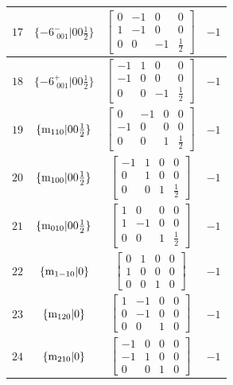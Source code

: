 \documentclass[fleqn,8pt]{jsarticle}
\begin{document}
\begin{longtable}{cccc}
$ 17 $ & $ \{-6^{-}_{\,\,001}|0 0 \frac{1}{2}\} $ & $ \begin{bmatrix} 0 & -1 & 0 & 0 \\ 1 & -1 & 0 & 0 \\ 0 & 0 & -1 & \frac{1}{2} \end{bmatrix} $ & $ -1 $ \\ \hline
$ 18 $ & $ \{-6^{+}_{\,\,001}|0 0 \frac{1}{2}\} $ & $ \begin{bmatrix} -1 & 1 & 0 & 0 \\ -1 & 0 & 0 & 0 \\ 0 & 0 & -1 & \frac{1}{2} \end{bmatrix} $ & $ -1 $ \\ \hline
$ 19 $ & $ \{{\rm m}_{110}|0 0 \frac{1}{2}\} $ & $ \begin{bmatrix} 0 & -1 & 0 & 0 \\ -1 & 0 & 0 & 0 \\ 0 & 0 & 1 & \frac{1}{2} \end{bmatrix} $ & $ -1 $ \\ \hline
$ 20 $ & $ \{{\rm m}_{100}|0 0 \frac{1}{2}\} $ & $ \begin{bmatrix} -1 & 1 & 0 & 0 \\ 0 & 1 & 0 & 0 \\ 0 & 0 & 1 & \frac{1}{2} \end{bmatrix} $ & $ -1 $ \\ \hline
$ 21 $ & $ \{{\rm m}_{010}|0 0 \frac{1}{2}\} $ & $ \begin{bmatrix} 1 & 0 & 0 & 0 \\ 1 & -1 & 0 & 0 \\ 0 & 0 & 1 & \frac{1}{2} \end{bmatrix} $ & $ -1 $ \\ \hline
$ 22 $ & $ \{{\rm m}_{1-10}|0\} $ & $ \begin{bmatrix} 0 & 1 & 0 & 0 \\ 1 & 0 & 0 & 0 \\ 0 & 0 & 1 & 0 \end{bmatrix} $ & $ -1 $ \\ \hline
$ 23 $ & $ \{{\rm m}_{120}|0\} $ & $ \begin{bmatrix} 1 & -1 & 0 & 0 \\ 0 & -1 & 0 & 0 \\ 0 & 0 & 1 & 0 \end{bmatrix} $ & $ -1 $ \\ \hline
$ 24 $ & $ \{{\rm m}_{210}|0\} $ & $ \begin{bmatrix} -1 & 0 & 0 & 0 \\ -1 & 1 & 0 & 0 \\ 0 & 0 & 1 & 0 \end{bmatrix} $ & $ -1 $ \\
\end{longtable}
\end{document}
